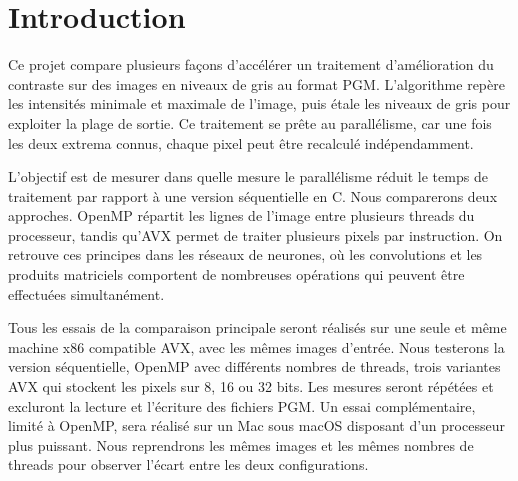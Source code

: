 \section{Introduction}

Ce projet compare plusieurs façons d'accélérer un traitement d'amélioration du contraste sur des images en niveaux de gris au format PGM. L'algorithme repère les intensités minimale et maximale de l'image, puis étale les niveaux de gris pour exploiter la plage de sortie. Ce traitement se prête au parallélisme, car une fois les deux extrema connus, chaque pixel peut être recalculé indépendamment.

L'objectif est de mesurer dans quelle mesure le parallélisme réduit le temps de traitement par rapport à une version séquentielle en C. Nous comparerons deux approches. OpenMP répartit les lignes de l'image entre plusieurs threads du processeur, tandis qu'AVX permet de traiter plusieurs pixels par instruction. On retrouve ces principes dans les réseaux de neurones, où les convolutions et les produits matriciels comportent de nombreuses opérations qui peuvent être effectuées simultanément.

Tous les essais de la comparaison principale seront réalisés sur une seule et même machine x86 compatible AVX, avec les mêmes images d'entrée. Nous testerons la version séquentielle, OpenMP avec différents nombres de threads, trois variantes AVX qui stockent les pixels sur 8, 16 ou 32 bits. Les mesures seront répétées et excluront la lecture et l'écriture des fichiers PGM. Un essai complémentaire, limité à OpenMP, sera réalisé sur un Mac sous macOS disposant d'un processeur plus puissant. Nous reprendrons les mêmes images et les mêmes nombres de threads pour observer l'écart entre les deux configurations.
